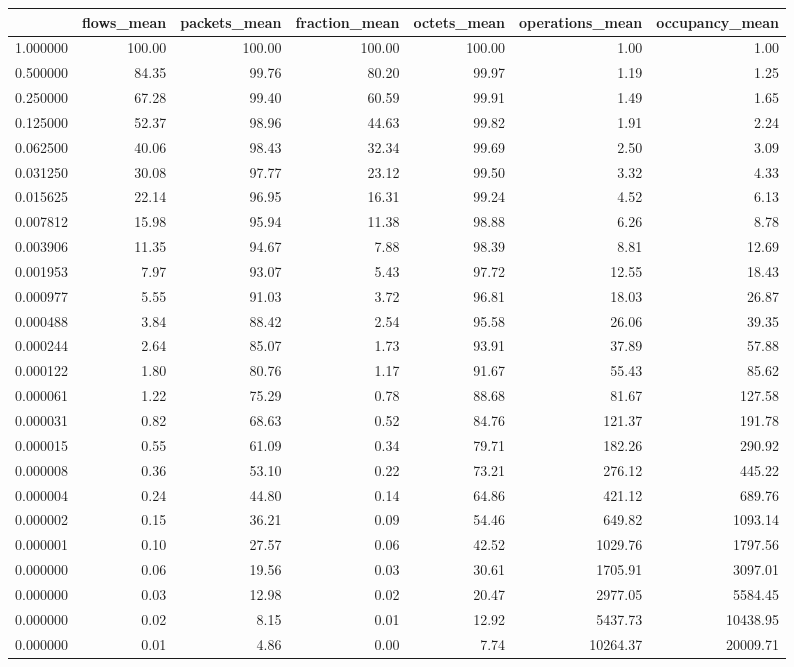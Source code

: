 \begin{tabular}{lrrrrrr}
\toprule
 & flows_mean & packets_mean & fraction_mean & octets_mean & operations_mean & occupancy_mean \\
\midrule
1.000000 & 100.00 & 100.00 & 100.00 & 100.00 & 1.00 & 1.00 \\
0.500000 & 84.35 & 99.76 & 80.20 & 99.97 & 1.19 & 1.25 \\
0.250000 & 67.28 & 99.40 & 60.59 & 99.91 & 1.49 & 1.65 \\
0.125000 & 52.37 & 98.96 & 44.63 & 99.82 & 1.91 & 2.24 \\
0.062500 & 40.06 & 98.43 & 32.34 & 99.69 & 2.50 & 3.09 \\
0.031250 & 30.08 & 97.77 & 23.12 & 99.50 & 3.32 & 4.33 \\
0.015625 & 22.14 & 96.95 & 16.31 & 99.24 & 4.52 & 6.13 \\
0.007812 & 15.98 & 95.94 & 11.38 & 98.88 & 6.26 & 8.78 \\
0.003906 & 11.35 & 94.67 & 7.88 & 98.39 & 8.81 & 12.69 \\
0.001953 & 7.97 & 93.07 & 5.43 & 97.72 & 12.55 & 18.43 \\
0.000977 & 5.55 & 91.03 & 3.72 & 96.81 & 18.03 & 26.87 \\
0.000488 & 3.84 & 88.42 & 2.54 & 95.58 & 26.06 & 39.35 \\
0.000244 & 2.64 & 85.07 & 1.73 & 93.91 & 37.89 & 57.88 \\
0.000122 & 1.80 & 80.76 & 1.17 & 91.67 & 55.43 & 85.62 \\
0.000061 & 1.22 & 75.29 & 0.78 & 88.68 & 81.67 & 127.58 \\
0.000031 & 0.82 & 68.63 & 0.52 & 84.76 & 121.37 & 191.78 \\
0.000015 & 0.55 & 61.09 & 0.34 & 79.71 & 182.26 & 290.92 \\
0.000008 & 0.36 & 53.10 & 0.22 & 73.21 & 276.12 & 445.22 \\
0.000004 & 0.24 & 44.80 & 0.14 & 64.86 & 421.12 & 689.76 \\
0.000002 & 0.15 & 36.21 & 0.09 & 54.46 & 649.82 & 1093.14 \\
0.000001 & 0.10 & 27.57 & 0.06 & 42.52 & 1029.76 & 1797.56 \\
0.000000 & 0.06 & 19.56 & 0.03 & 30.61 & 1705.91 & 3097.01 \\
0.000000 & 0.03 & 12.98 & 0.02 & 20.47 & 2977.05 & 5584.45 \\
0.000000 & 0.02 & 8.15 & 0.01 & 12.92 & 5437.73 & 10438.95 \\
0.000000 & 0.01 & 4.86 & 0.00 & 7.74 & 10264.37 & 20009.71 \\
\bottomrule
\end{tabular}
